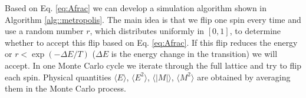 Based on Eq. \ref{eq:Afrac} we can develop a simulation algorithm shown in Algorithm \ref{alg::metropolis}. 
The main idea is that we flip one spin every time and use a random number $r$, which distributes uniformly in $[0,1]$, to determine whether to accept this flip based on Eq. \ref{eq:Afrac}. 
If this flip reduces the energy or $r<\exp\left(-\Delta E/T\right)$ ($\Delta E$ is the energy change in the transition) we will accept. 
In one Monte Carlo cycle we iterate through the full lattice and try to flip each spin. 
Physical quantities $\langle E \rangle$, $\langle E^2 \rangle$, $\langle |M| \rangle$, $\langle M^2 \rangle$ 
are obtained by averaging them in the Monte Carlo process. 
